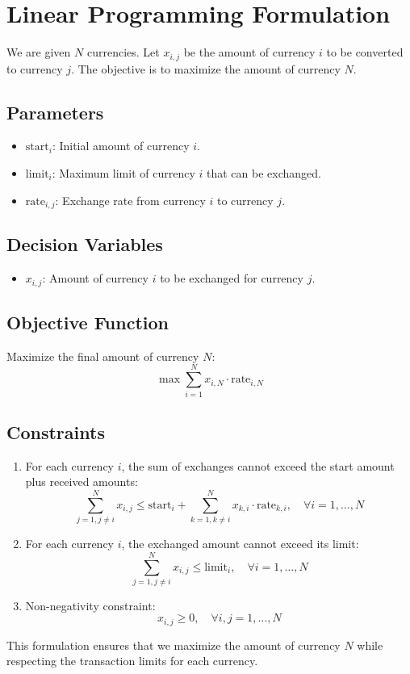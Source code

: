 \documentclass{article}
\begin{document}
\section*{Linear Programming Formulation}

We are given \( N \) currencies. Let \( x_{i,j} \) be the amount of currency \( i \) to be converted to currency \( j \). The objective is to maximize the amount of currency \( N \).

\subsection*{Parameters}
\begin{itemize}
    \item \( \text{start}_i \): Initial amount of currency \( i \).
    \item \( \text{limit}_i \): Maximum limit of currency \( i \) that can be exchanged.
    \item \( \text{rate}_{i,j} \): Exchange rate from currency \( i \) to currency \( j \).
\end{itemize}

\subsection*{Decision Variables}
\begin{itemize}
    \item \( x_{i,j} \): Amount of currency \( i \) to be exchanged for currency \( j \).
\end{itemize}

\subsection*{Objective Function}
Maximize the final amount of currency \( N \):
\[
\max \sum_{i=1}^{N} x_{i,N} \cdot \text{rate}_{i,N}
\]

\subsection*{Constraints}
\begin{enumerate}
    \item For each currency \( i \), the sum of exchanges cannot exceed the start amount plus received amounts:
    \[
    \sum_{j=1, j \neq i}^{N} x_{i,j} \leq \text{start}_i + \sum_{k=1, k \neq i}^{N} x_{k,i} \cdot \text{rate}_{k,i}, \quad \forall i = 1, \dots, N
    \]
    \item For each currency \( i \), the exchanged amount cannot exceed its limit:
    \[
    \sum_{j=1, j \neq i}^{N} x_{i,j} \leq \text{limit}_i, \quad \forall i = 1, \dots, N
    \]
    \item Non-negativity constraint:
    \[
    x_{i,j} \geq 0, \quad \forall i, j = 1, \dots, N
    \]
\end{enumerate}

This formulation ensures that we maximize the amount of currency \( N \) while respecting the transaction limits for each currency.
\end{document}
